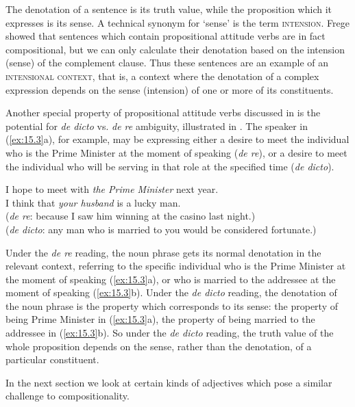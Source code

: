 The denotation of a sentence is its truth value, while the proposition which it expresses is its sense. A technical synonym for ‘sense’ is the term \textsc{intension}. Frege showed that sentences which contain propositional attitude verbs are in fact compositional, but we can only calculate their denotation based on the intension (sense) of the complement clause. Thus these sentences are an example of an \textsc{intensional context}, that is, a context where the denotation of a complex expression depends on the sense (intension) of one or more of its constituents.



Another special property of propositional attitude verbs discussed in  is the potential for \textit{de dicto} vs. \textit{de re} ambiguity, illustrated in . The speaker in (\ref{ex:15.3}a), for example, may be expressing either a desire to meet the individual who is the Prime Minister at the moment of speaking (\textit{de re}), or a desire to meet the individual who will be serving in that role at the specified time (\textit{de dicto}).


\ea \label{ex:15.3}
\ea \label{ex:15.} I hope to meet with \textit{the Prime Minister} next year.\\
\ex I think that \textit{your husband} is a lucky man.\\
  (\textit{de re}: because I saw him winning at the casino last night.)\\
  (\textit{de dicto}: any man who is married to you would be considered fortunate.)
                       \z
\z


Under the \textit{de re} reading, the noun phrase gets its normal denotation in the relevant context, referring to the specific individual who is the Prime Minister at the moment of speaking (\ref{ex:15.3}a), or who is married to the addressee at the moment of speaking (\ref{ex:15.3}b). Under the \textit{de dicto} reading, the denotation of the noun phrase is the property which corresponds to its sense: the property of being Prime Minister in (\ref{ex:15.3}a), the property of being married to the addressee in (\ref{ex:15.3}b). So under the \textit{de dicto} reading, the truth value of the whole proposition depends on the sense, rather than the denotation, of a particular constituent.



In the next section we look at certain kinds of adjectives which pose a similar challenge to compositionality.


